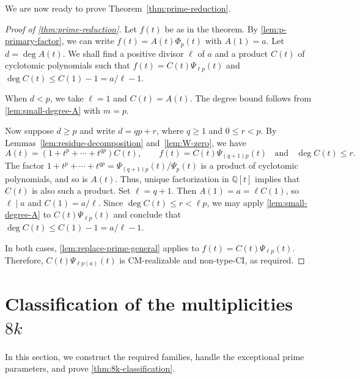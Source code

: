 \documentclass[11pt,a4paper]{amsart}
\theoremstyle{definition}
\theoremstyle{remark}
\newcommand{\QQ}{\mathbb Q}
\begin{document}
We are now ready to prove Theorem~\ref{thm:prime-reduction}.
\begin{proof}[Proof of \cref{thm:prime-reduction}]
Let $f(t)$ be as in the theorem. By \cref{lem:p-primary-factor}, we can write $f(t)=A(t)\Phi_p(t)$ with $A(1)=a$. Let $d=\deg A(t)$. We shall find a positive divisor $\ell$ of $a$ and a product $C(t)$ of cyclotomic polynomials such that $f(t)=C(t)\Psi_{\ell p}(t)$ and $\deg C(t)\le C(1)-1=a/\ell-1$.

When $d<p$, we take $\ell=1$ and $C(t)=A(t)$. The degree bound follows from \cref{lem:small-degree-A} with $m=p$.

Now suppose $d\ge p$ and write $d=qp+r$, where $q\ge1$ and $0\le r<p$. By Lemmas~\ref{lem:residue-decomposition} and~\ref{lem:W-zero}, we have
\[A(t)=(1+t^p+\cdots+t^{qp})C(t),\qquad f(t)=C(t)\Psi_{(q+1)p}(t)\;\;\text{ and }\;\; \deg C(t)\le r.\]
The factor $1+t^p+\cdots+t^{qp}=\Psi_{(q+1)p}(t)/\Psi_p(t)$ is a product of cyclotomic polynomials, and so is $A(t)$. Thus, unique factorization in $\QQ[t]$ implies that $C(t)$ is also such a product. Set $\ell=q+1$. Then $A(1)=a=\ell C(1)$, so $\ell\mid a$ and $C(1)=a/\ell$. Since $\deg C(t)\le r<\ell p$, we may apply \cref{lem:small-degree-A} to $C(t)\Psi_{\ell p}(t)$ and conclude that $\deg C(t)\le C(1)-1=a/\ell-1$.

In both cases, \cref{lem:replace-prime-general} applies to $f(t)=C(t)\Psi_{\ell p}(t)$. Therefore, $C(t)\Psi_{\ell p(a)}(t)$ is CM-realizable and non-type-CI, as required.
\end{proof}

\bigskip
\section{Classification of the multiplicities \texorpdfstring{$8k$}{8k}}\label{sec:8k}
In this section, we construct the required families, handle the exceptional prime parameters, and prove \cref{thm:8k-classification}.
\end{document}
